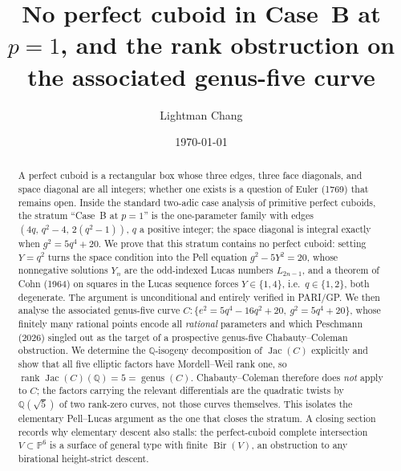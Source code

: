 \documentclass[11pt,reqno]{amsart}
\theoremstyle{plain}
\theoremstyle{definition}
\newcommand{\Q}{\mathbb{Q}}
\newcommand{\PP}{\mathbb{P}}
\newcommand{\Bir}{\operatorname{Bir}}
\DeclareMathOperator{\Jac}{Jac}
\DeclareMathOperator{\rank}{rank}
\begin{document}
\title[No perfect cuboid in Case~B at \texorpdfstring{$p=1$}{p=1}]{No perfect cuboid in Case~B at \texorpdfstring{$p=1$}{p=1}, and the rank obstruction on the associated genus-five curve}

\author{Lightman Chang}
\address{Independent Researcher}


\date{\today}

\begin{abstract}
A perfect cuboid is a rectangular box whose three edges, three face diagonals,
and space diagonal are all integers; whether one exists is a question of Euler
(1769) that remains open. Inside the standard two-adic case analysis of
primitive perfect cuboids, the stratum ``Case~B at $p=1$'' is the
one-parameter family with edges $(4q,\,q^2-4,\,2(q^2-1))$, $q$ a positive
integer; the space diagonal is integral exactly when $g^2=5q^4+20$. We prove
that this stratum contains no perfect cuboid: setting $Y=q^2$ turns the space
condition into the Pell equation $g^2-5Y^2=20$, whose nonnegative solutions
$Y_n$ are the odd-indexed Lucas numbers $L_{2n-1}$, and a theorem of Cohn
(1964) on squares in the Lucas sequence forces $Y\in\{1,4\}$, i.e.\ $q\in\{1,2\}$,
both degenerate. The argument is unconditional and entirely verified in
PARI/GP. We then analyse the associated genus-five curve
$C:\{e^2=5q^4-16q^2+20,\ g^2=5q^4+20\}$, whose finitely many rational points
encode all \emph{rational} parameters and which Peschmann (2026) singled out as
the target of a prospective genus-five Chabauty--Coleman obstruction. We
determine the $\Q$-isogeny decomposition of $\Jac(C)$ explicitly and show that
all five elliptic factors have Mordell--Weil rank one, so
$\rank\Jac(C)(\Q)=5=\operatorname{genus}(C)$. Chabauty--Coleman therefore does
\emph{not} apply to $C$; the factors carrying the relevant differentials are the
quadratic twists by $\Q(\sqrt5)$ of two rank-zero curves, not those curves
themselves. This isolates the elementary Pell--Lucas argument as the one that
closes the stratum. A closing section records why elementary descent also stalls:
the perfect-cuboid complete intersection $V\subset\PP^6$ is a surface of general
type with finite $\Bir(V)$, an obstruction to any birational height-strict descent.
\end{abstract}
\end{document}
